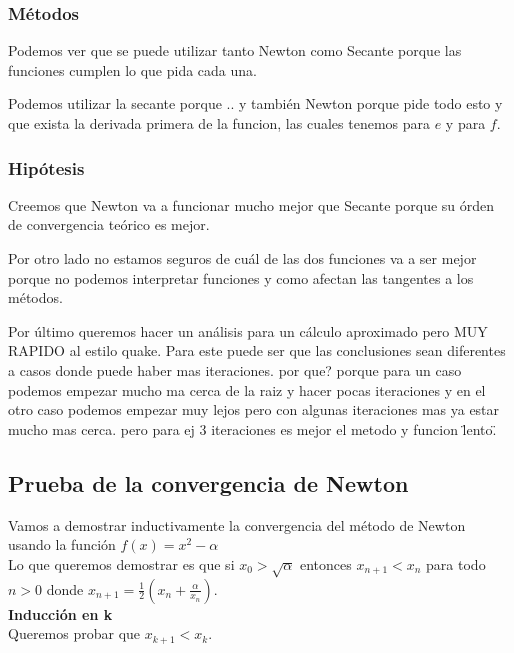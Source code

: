 \subsubsection{Métodos}
Podemos ver que se puede utilizar tanto Newton como Secante porque las
funciones cumplen lo que pida cada una.

Podemos utilizar la secante porque .. y también Newton porque pide todo esto y
que exista la derivada primera de la funcion, las cuales tenemos para $e$ y para
$f$.

\subsubsection{Hipótesis}
Creemos que Newton va a funcionar mucho mejor que Secante porque su órden de
convergencia teórico es mejor.

Por otro lado no estamos seguros de cuál de las dos funciones va a ser mejor
porque no podemos interpretar funciones y como afectan las tangentes a los
métodos.

Por último queremos hacer un análisis para un cálculo aproximado pero MUY
RAPIDO al estilo quake. Para este puede ser que las conclusiones sean
diferentes a casos donde puede haber mas iteraciones.  por que? porque para un
caso podemos empezar mucho ma cerca de la raiz y hacer pocas iteraciones y en
el otro caso podemos empezar muy lejos pero con algunas iteraciones mas ya
estar mucho mas cerca. pero para ej 3 iteraciones es mejor el metodo y funcion
\"lento\".

\subsection{Prueba de la convergencia de Newton}
Vamos a demostrar inductivamente la convergencia del método de Newton usando la función $\displaystyle f(x) = x^2 - \alpha$\\

Lo que queremos demostrar es que si $x_0 > \sqrt{\alpha}$ entonces $x_{n + 1} < x_n$ para todo $n > 0$ donde $\displaystyle x_{n + 1} = \frac{1}{2}(x_n + \frac{\alpha}{x_n})$.\\

{\large \bf Inducción en k}\\
Queremos probar que $x_{k + 1} < x_k$.\\

